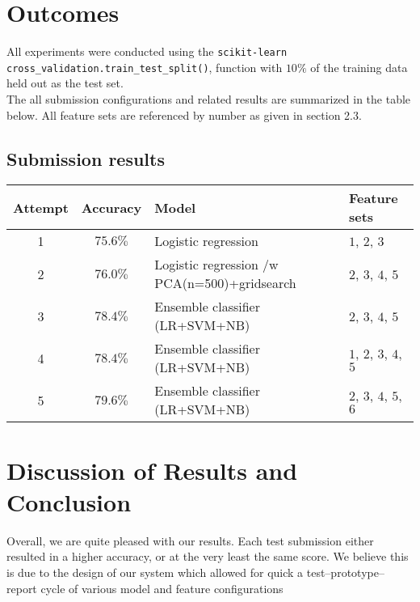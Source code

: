 \documentclass[
10pt, %
a4paper, %
oneside, %
headinclude,footinclude, %
BCOR5mm, %
]{scrartcl}
\begin{document}
\section{Outcomes}

All experiments were conducted using the \texttt{scikit-learn} 
\texttt{cross\_validation.train\_test\_split()}, function with $10\%$ of
the training data held out as the test set. \\

\noindent The all submission configurations and related results are 
summarized in the table below. All feature sets are referenced by number as 
given in section 2.3.

\subsection{Submission results}
\begin{center}
    \begin{tabular}{| c | c | l | l|}
    \hline
    Attempt & Accuracy & Model               & Feature sets    \\ \hline
    1       & $75.6\%$ & Logistic regression  & $1$, $2$, $3$  \\ \hline
    2       & $76.0\%$ & Logistic regression /w PCA(n=500)+gridsearch &  $2$, $3$, $4$, $5$ \\ \hline
    3       & $78.4\%$ & Ensemble classifier (LR+SVM+NB) &$2$, $3$, $4$, $5$       \\ \hline
    4       & $78.4\%$ & Ensemble classifier (LR+SVM+NB) & $1$, $2$, $3$, $4$, $5$ \\ \hline
    5       & $79.6\%$ & Ensemble classifier (LR+SVM+NB) & $2$, $3$, $4$, $5$, $6$ \\ \hline
    \end{tabular}
\end{center}

\section{Discussion of Results and Conclusion}

Overall, we are quite pleased with our results. Each test submission either 
resulted in a higher accuracy, or at the very least the same score. We believe
this is due to the design of our system which allowed for quick a 
test--prototype--report cycle of various model and feature configurations
\end{document}
